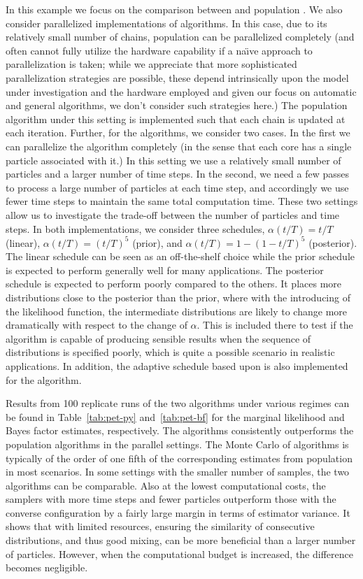 In this example we focus on the comparison between \smc[2] and population
\mcmc. We also consider parallelized implementations of algorithms. In this
case, due to its relatively small number of chains, population \mcmc can be
parallelized completely (and often cannot fully utilize the hardware
capability if a na\"\i ve approach to parallelization is taken; while we
appreciate that more sophisticated parallelization strategies are possible,
these depend intrinsically upon the model under investigation and the hardware
employed and given our focus on automatic and general algorithms, we don't
consider such strategies here.) The population \mcmc algorithm under this
setting is implemented such that each chain is updated at each iteration.
Further, for the \smc algorithms, we consider two cases. In the first we can
parallelize the algorithm completely (in the sense that each core has a single
particle associated with it.) In this setting we use a relatively small number
of particles and a larger number of time steps. In the second, we need a few
passes to process a large number of particles at each time step, and
accordingly we use fewer time steps to maintain the same total computation
time. These two settings allow us to investigate the trade-off between the
number of particles and time steps. In both implementations, we consider three
schedules, $\alpha(t/T) = t/T$ (linear), $\alpha(t/T) = (t/T)^5$ (prior), and
$\alpha(t/T) = 1 - (1 - t/T)^5$ (posterior). The linear schedule can be seen
as an off-the-shelf choice while the prior schedule is expected to perform
generally well for many applications. The posterior schedule is expected to
perform poorly compared to the others. It places more distributions close to
the posterior than the prior, where with the introducing of the likelihood
function, the intermediate distributions are likely to change more
dramatically with respect to the change of $\alpha$. This is included there to
test if the algorithm is capable of producing sensible results when the
sequence of distributions is specified poorly, which is quite a possible
scenario in realistic applications. In addition, the adaptive schedule based
upon \cess is also implemented for the \smc[2] algorithm.

Results from 100 replicate runs of the two algorithms under various regimes
can be found in Table~\ref{tab:pet-py} and~\ref{tab:pet-bf} for the marginal
likelihood and Bayes factor estimates, respectively. The \smc algorithms
consistently outperforms the population \mcmc algorithms in the parallel
settings. The Monte Carlo \sd of \smc algorithms is typically of the order of
one fifth of the corresponding estimates from population \mcmc in most
scenarios. In some settings with the smaller number of samples, the two
algorithms can be comparable. Also at the lowest computational costs, the
samplers with more time steps and fewer particles outperform those with the
converse configuration by a fairly large margin in terms of estimator
variance. It shows that with limited resources, ensuring the similarity of
consecutive distributions, and thus good mixing, can be more beneficial than a
larger number of particles. However, when the computational budget is
increased, the difference becomes negligible.

